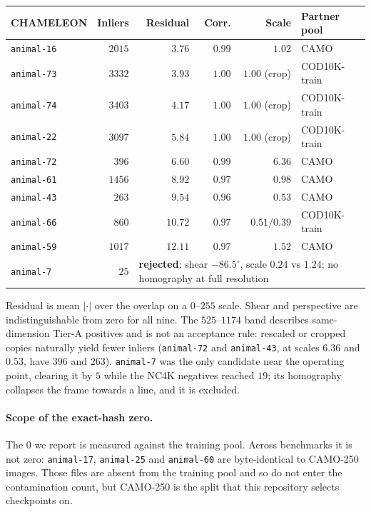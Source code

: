 \documentclass{article}
\begin{document}
\begin{center}\small
\setlength{\tabcolsep}{4pt}
\begin{tabular}{lrrrrl}
\toprule
CHAMELEON & Inliers & Residual & Corr. & Scale & Partner pool \\
\midrule
\texttt{animal-16} & $2015$ & $3.76$ & $0.99$ & $1.02$ & CAMO \\
\texttt{animal-73} & $3332$ & $3.93$ & $1.00$ & $1.00$ (crop) & COD10K-train \\
\texttt{animal-74} & $3403$ & $4.17$ & $1.00$ & $1.00$ (crop) & COD10K-train \\
\texttt{animal-22} & $3097$ & $5.84$ & $1.00$ & $1.00$ (crop) & COD10K-train \\
\texttt{animal-72} & $396$ & $6.60$ & $0.99$ & $6.36$ & CAMO \\
\texttt{animal-61} & $1456$ & $8.92$ & $0.97$ & $0.98$ & CAMO \\
\texttt{animal-43} & $263$ & $9.54$ & $0.96$ & $0.53$ & CAMO \\
\texttt{animal-66} & $860$ & $10.72$ & $0.97$ & $0.51/0.39$ & COD10K-train \\
\texttt{animal-59} & $1017$ & $12.11$ & $0.97$ & $1.52$ & CAMO \\
\midrule
\texttt{animal-7} & $25$ & \multicolumn{4}{l}{\textbf{rejected}; shear $-86.5^\circ$, scale $0.24$ vs $1.24$; no homography at full resolution} \\
\bottomrule
\end{tabular}
\end{center}

Residual is mean $|{\cdot}|$ over the overlap on a $0$--$255$ scale. Shear and perspective are
indistinguishable from zero for all nine. The $525$--$1174$ band describes same-dimension Tier-A
positives and is not an acceptance rule: rescaled or cropped copies naturally yield fewer inliers
(\texttt{animal-72} and \texttt{animal-43}, at scales $6.36$ and $0.53$, have $396$ and $263$).
\texttt{animal-7} was the only candidate near the operating point, clearing it by $5$ while the NC4K
negatives reached $19$; its homography collapses the frame towards a line, and it is excluded.

\paragraph{Scope of the exact-hash zero.} The $0$ we report is measured against the training pool.
Across benchmarks it is not zero: \texttt{animal-17}, \texttt{animal-25} and \texttt{animal-60} are
byte-identical to CAMO-250 images. Those files are absent from the training pool and so do not enter
the contamination count, but CAMO-250 is the split that this repository selects checkpoints on.
\end{document}
